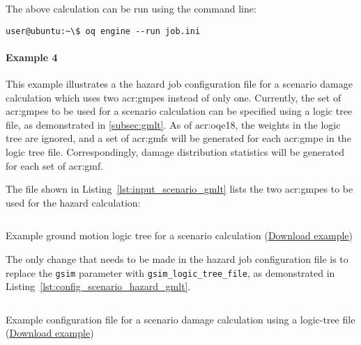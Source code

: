 The above calculation can be run using the command line:

\begin{verbatim}
user@ubuntu:~\$ oq engine --run job.ini
\end{verbatim}


\paragraph{Example 4}

This example illustrates a the hazard job configuration file for a scenario
damage calculation which uses two \glspl{acr:gmpe} instead of only one.
Currently, the set of \glspl{acr:gmpe} to be used for a scenario calculation
can be specified using a logic tree file, as demonstrated in
\ref{subsec:gmlt}. As of \glsdesc{acr:oqe18}, the weights in the logic tree
are ignored, and a set of \glspl{acr:gmf} will be generated for each
\gls{acr:gmpe} in the logic tree file. Correspondingly, damage distribution
statistics will be generated for each set of \gls{acr:gmf}.

The file shown in Listing~\ref{lst:input_scenario_gmlt} lists the two
\glspl{acr:gmpe} to be used for the hazard calculation:

\begin{listing}[htbp]
  \inputminted[firstline=1,firstnumber=1,fontsize=\footnotesize,frame=single,linenos,bgcolor=lightgray,label=gsim\_logic\_tree.xml]{xml}{oqum/risk/verbatim/input_scenario_gmlt.xml}
  \caption{Example ground motion logic tree for a scenario calculation (\href{https://raw.githubusercontent.com/GEMScienceTools/oq-engine-docs/master/oqum/risk/verbatim/input_scenario_gmlt.xml}{Download example})}
  \label{lst:input_scenario_gmlt}
\end{listing}

The only change that needs to be made in the hazard job configuration file is
to replace the \Verb+gsim+ parameter with \Verb+gsim_logic_tree_file+, as
demonstrated in Listing~\ref{lst:config_scenario_hazard_gmlt}.

\begin{listing}[htbp]
  \inputminted[firstline=1,firstnumber=1,fontsize=\footnotesize,frame=single,linenos,bgcolor=lightgray,label=job\_hazard.ini]{ini}{oqum/risk/verbatim/config_scenario_hazard_gmlt.ini}
  \caption{Example configuration file for a scenario damage calculation using a logic-tree file (\href{https://raw.githubusercontent.com/GEMScienceTools/oq-engine-docs/master/oqum/risk/verbatim/config_scenario_hazard_gmlt.ini}{Download example})}
  \label{lst:config_scenario_hazard_gmlt}
\end{listing}


